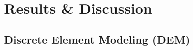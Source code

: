 \documentclass[preprint,11pt,authoryear]{elsarticle}
\newcommand{\gpnote}[1]{{\textcolor{green} {***giannis: #1}}}
\newcommand{\gpnote}[1]{}
\begin{document}



\section{Results \& Discussion}
\label{sec:Results}
\subsection{Discrete Element Modeling (DEM)}
\end{document}

